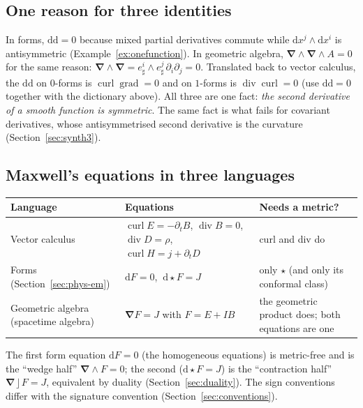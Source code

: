 \documentclass[11pt,a4paper]{article}
\renewcommand{\arraystretch}{1.25}
\numberwithin{equation}{section}
\theoremstyle{definition}
\theoremstyle{plain}
\newcommand{\dd}{\mathrm{d}}
\newcommand{\lc}{\mathbin{\rfloor}}
\newcommand{\pss}{I}
\newcommand{\hodge}{\star}
\newcommand{\vd}{\boldsymbol{\nabla}}               %
\begin{document}
\subsection{One reason for three identities}

\begin{synthesis}[$\dd\dd=0$, ``curl grad $=0$'' and ``div curl $=0$'']
In forms, $\dd\dd=0$ because mixed partial derivatives commute while $\dd x^j\wedge\dd x^i$ is antisymmetric (Example~\ref{ex:onefunction}). In geometric algebra, $\vd\wedge\vd\wedge A=0$ for the same reason: $\vd\wedge\vd=e^i_\sharp\wedge e^j_\sharp\,\partial_i\partial_j=0$.
Translated back to vector calculus, the $\dd\dd$ on $0$-forms is $\operatorname{curl}\operatorname{grad}=0$ and on $1$-forms is $\operatorname{div}\operatorname{curl}=0$ (use $\dd\dd=0$ together with the dictionary above). All three are one fact: \emph{the second derivative of a smooth function is symmetric}. The same fact is what fails for covariant derivatives, whose antisymmetrised second derivative is the curvature (Section~\ref{sec:synth3}).
\end{synthesis}

\subsection{Maxwell's equations in three languages}

\begin{center}
\small
\renewcommand{\arraystretch}{1.3}
\begin{tabular}{@{}p{3.5cm}p{5.0cm}p{5.6cm}@{}}
\toprule
\textbf{Language} & \textbf{Equations} & \textbf{Needs a metric?}\\
\midrule
Vector calculus & $\operatorname{curl}E=-\partial_tB$, $\operatorname{div}B=0$, $\operatorname{div}D=\rho$, $\operatorname{curl}H=j+\partial_tD$ & curl and div do\\
Forms (Section~\ref{sec:phys-em}) & $\dd F=0$, $\ \dd\hodge F=J$ & only $\hodge$ (and only its conformal class)\\
Geometric algebra (spacetime algebra) & $\vd F=J$ with $F=E+\pss B$ & the geometric product does; both equations are one\\
\bottomrule
\end{tabular}
\end{center}
The first form equation $\dd F=0$ (the homogeneous equations) is metric-free and is the ``wedge half'' $\vd\wedge F=0$; the second ($\dd\hodge F=J$) is the ``contraction half'' $\vd\lc F=J$, equivalent by duality (Section~\ref{sec:duality}). The sign conventions differ with the signature convention (Section~\ref{sec:conventions}).
\end{document}
